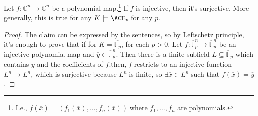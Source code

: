 \begin{theorem}\label{thm:Ax-Grothendieck}
	Let \(f\colon \mathbb{C} ^n \to \mathbb{C} ^n\) be a polynomial map.\footnote{I.e., \(f(\overline{x} ) = (f_1(\overline{x} ), \ldots , f_n(\overline{x} ))\) where \(f_1, \ldots , f_n\) are polynomials.} If \(f\) is injective, then it's surjective. More generally, this is true for any \(K \models \ACF_p\) for any \(p\).
\end{theorem}
\begin{proof}
	The claim can be expressed by the \hyperref[def:sentence]{sentences},
	so by \hyperref[col:Leftschetz-principle]{Leftschetz principle}, it's enough to prove that if for \(K = \overline{\mathbb{F}_p}\), for each \(p > 0\). Let \(f\colon \overline{\mathbb{F}}_p^n \to \overline{\mathbb{F}}_p^n\) be an injective polynomial map and \(\overline{y} \in \overline{\mathbb{F}}_p^n\). Then there is a finite subfield \(L \subseteq \overline{\mathbb{F}} _p \) which contains \(\overline{y}\) and the coefficients of \(f\).then, \(f\) restricts to an injective function \(L^n \to L^n\), which is surjective because \(L^n\) is finite, so \(\exists \overline{x} \in L^n\) such that \(f(\overline{x} ) = \overline{y} \).
\end{proof}

